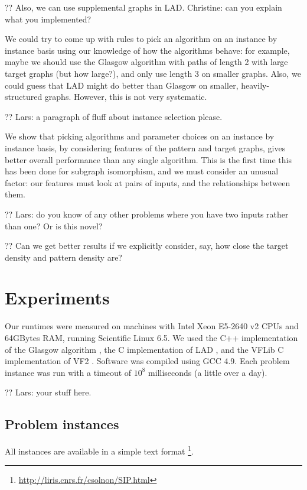 \documentclass{llncs}
\begin{document}
?? Also, we can use supplemental graphs in LAD. Christine: can you explain what you implemented?

We could try to come up with rules to pick an algorithm on an instance by instance basis using our
knowledge of how the algorithms behave: for example, maybe we should use the Glasgow algorithm with
paths of length 2 with large target graphs (but how large?), and only use length 3 on smaller
graphs. Also, we could guess that LAD might do better than Glasgow on smaller, heavily-structured
graphs. However, this is not very systematic.

?? Lars: a paragraph of fluff about instance selection please.

We show that picking algorithms and parameter choices on an instance by instance basis, by
considering features of the pattern and target graphs, gives better overall performance than any
single algorithm. This is the first time this has been done for subgraph isomorphism, and we must
consider an unusual factor: our features must look at pairs of inputs, and the relationships between
them.

?? Lars: do you know of any other problems where you have two inputs rather than one? Or is this
novel?

?? Can we get better results if we explicitly consider, say, how close the target density and
pattern density are?

\section{Experiments}

Our runtimes were measured on machines with Intel Xeon E5-2640 v2 CPUs and 64GBytes RAM, running
Scientific Linux 6.5. We used the C++ implementation of the Glasgow algorithm \cite{McCreesh:2015},
the C implementation of LAD \cite{Solnon:2010}, and the VFLib C implementation of VF2
\cite{Cordella:2004}. Software was compiled using GCC 4.9. Each problem instance was run with a
timeout of $10^8$ milliseconds (a little over a day).

?? Lars: your stuff here.

\subsection{Problem instances}

All instances are available in a simple text format
\footnote{\url{http://liris.cnrs.fr/csolnon/SIP.html}}.
\end{document}
